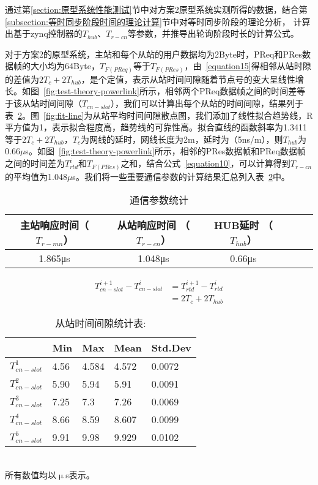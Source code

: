 通过第\ref{section:原型系统性能测试}节中对方案2原型系统实测所得的数据，结合第\ref{subsection:等时同步阶段时间的理论计算}节中对等时同步阶段的理论分析，
计算出基于zynq控制器的$T_{hub}$、$T_{r-cn}$等参数，并推导出轮询阶段时长的计算公式。

对于方案2的原型系统，主站和每个从站的用户数据均为2Byte时，PReq和PRes数据帧的大小均为64Byte，$T_{F(PReq)}$等于$T_{F(PRes)}$，由~\ref{equation15}得相邻从站时隙的差值为$2T_{c}+2T_{hub}$，是个定值，表示从站时间间隙随着节点号的变大呈线性增长。如图~\ref{fig:test-theory-powerlink}所示，相邻两个PReq数据帧之间的时间差等于该从站时间间隙（$T_{cn-slot}$），我们可以计算出每个从站的时间间隙，结果列于表~\ref{table:3.2}。图~\ref{fig:fit-line}为从站平均时间间隙散点图，我们添加了线性拟合趋势线，R平方值为1，表示拟合程度高，趋势线的可靠性高。拟合直线的函数斜率为1.3411等于$2T_{c}+2T_{hub}$，$T_{c}$为网线的延时，网线长度为2m，延时为（5ns/m），则$T_{hub}$为0.66$\mu$s。如图~\ref{fig:test-theory-powerlink}所示，相邻的PRes数据帧和PReq数据帧之间的时间差为$T_{rtd}^{i}$和$T_{F(PRes)}$之和，结合公式~\ref{equation10}，可以计算得到$T_{r-cn}$的平均值为1.048$\mu$s。我们将一些重要通信参数的计算结果汇总列入表~\ref{table:3.2}中。

\begin{table}[hbt]
	\centering
	\caption{通信参数统计}
	\begin{tabular}{cccccc}
		\toprule
		主站响应时间（$T_{r-mn}$） & 从站响应时间 （$T_{r-cn}$）& HUB延时 （$T_{hub}$）\\
		\midrule
		1.865μs & 1.048μs & 0.66μs\\
		\bottomrule
	\end{tabular}
	\label{table:3.2}
\end{table}

\begin{equation}
\begin{split}
\label{equation15}
T_{cn-slot}^{i+1}-T_{cn-slot}^{i}&=T_{rtd}^{i+1}-T_{rtd}^{i}\\
&=2T_{c}+2T_{hub}
\end{split}
\end{equation}

\begin{table}[hbtp]
	\centering
	\caption{从站时间间隙统计表:}
	\begin{tabular}{p{70 pt}p{70 pt}p{70 pt}p{70 pt}p{70 pt}}
		\toprule
		& Min & Max & Mean & Std.Dev\\
		\midrule
		$T_{cn-slot}^{1}$ & 4.56 & 4.584 & 4.572 & 0.0072\\
		$T_{cn-slot}^{2}$ & 5.90 & 5.94 & 5.91 & 0.0091\\
		$T_{cn-slot}^{3}$ & 7.25 & 7.3 & 7.26 & 0.0069\\
		$T_{cn-slot}^{4}$ & 8.66 & 8.59 & 8.607 & 0.0099\\
		$T_{cn-slot}^{5}$ & 9.91 & 9.98 & 9.929 & 0.0102\\
		\bottomrule
	\end{tabular}
	\\
	\footnotesize{所有数值均以$\upmu$s表示。}
	\label{table:3.2}
\end{table}

